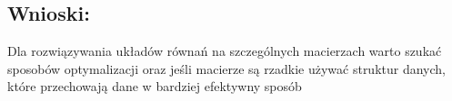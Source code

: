 \subsection{Wnioski: }
Dla rozwiązywania układów równań na szczególnych macierzach warto szukać sposobów optymalizacji oraz jeśli macierze są rzadkie używać struktur danych, które przechowają dane w bardziej efektywny sposób
